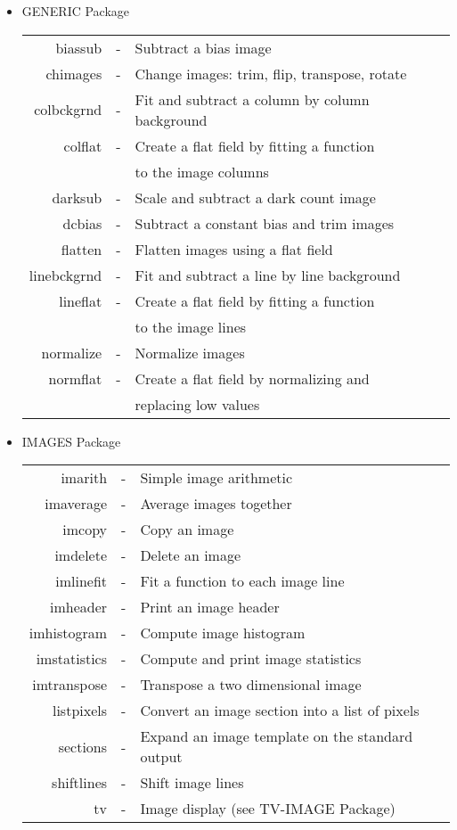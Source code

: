 \begin{itemize}
\item GENERIC Package \\

\begin{tabular}{rcl}

	biassub & - & Subtract a bias image\\
       chimages & - & Change images: trim, flip, transpose, rotate\\
     colbckgrnd & - & Fit and subtract a column by column background\\
	colflat & - & Create a flat field by fitting a function \\
		&&	to the image columns\\
	darksub & - & Scale and subtract a dark count image\\
	 dcbias & - & Subtract a constant bias and trim images\\
        flatten & - & Flatten images using a flat field\\
    linebckgrnd & - & Fit and subtract a line by line background\\
       lineflat & - & Create a flat field by fitting a function \\
		&&	to the image lines\\
      normalize & - & Normalize images\\
       normflat & - & Create a flat field by normalizing and \\
		&&	replacing low values

\end{tabular}

\item IMAGES Package \\

\begin{tabular}{rcl}

        imarith & - & Simple image arithmetic\\
      imaverage & - & Average images together\\
	 imcopy & - & Copy an image\\
       imdelete & - & Delete an image\\
      imlinefit & - & Fit a function to each image line\\
       imheader & - & Print an image header\\
    imhistogram & - & Compute image histogram\\
   imstatistics & - & Compute and print image statistics\\
    imtranspose & - & Transpose a two dimensional image\\
     listpixels & - & Convert an image section into a list of pixels\\
       sections & - & Expand an image template on the standard output\\
     shiftlines & - & Shift image lines\\
             tv & - & Image display (see TV-IMAGE Package)


\end{tabular}
\end{itemize}
